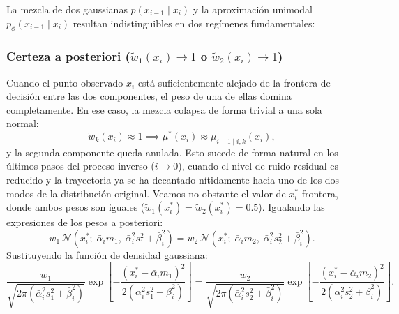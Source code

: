 \documentclass[11pt,a4paper]{article}
\begin{document}
La mezcla de dos gaussianas $p(x_{i-1} \mid x_i)$ y la aproximación unimodal $p_\phi(x_{i-1} \mid x_i)$ resultan indistinguibles en dos regímenes fundamentales:

\subsubsection{Certeza a posteriori ($\tilde{w}_1(x_i) \to 1$ o $\tilde{w}_2(x_i) \to 1$)}
Cuando el punto observado $x_i$ está suficientemente alejado de la frontera de decisión entre las dos componentes, el peso de una de ellas domina completamente. En ese caso, la mezcla colapsa de forma trivial a una sola normal:
\[
\tilde{w}_k(x_i) \approx 1 \implies \mu^*(x_i) \approx \mu_{i-1\mid i, k}(x_i),
\]
y la segunda componente queda anulada. Esto sucede de forma natural en los últimos pasos del proceso inverso ($i \to 0$), cuando el nivel de ruido residual es reducido y la trayectoria ya se ha decantado nítidamente hacia uno de los dos modos de la distribución original. Veamos no obstante el valor de $x_i^*$ frontera, donde ambos pesos son iguales ($\tilde{w}_1(x_i^*) = \tilde{w}_2(x_i^*) = 0.5$). Igualando las expresiones de los pesos a posteriori:
\[
w_1 \, \mathcal{N}\left(x_i^*;\; \bar{\alpha}_i m_1,\; \bar{\alpha}_i^2 s_1^2 + \bar{\beta}_i^2\right) = w_2 \, \mathcal{N}\left(x_i^*;\; \bar{\alpha}_i m_2,\; \bar{\alpha}_i^2 s_2^2 + \bar{\beta}_i^2\right).
\]
Sustituyendo la función de densidad gaussiana:
\[
\frac{w_1}{\sqrt{2\pi(\bar{\alpha}_i^2 s_1^2 + \bar{\beta}_i^2)}} \exp\left[-\frac{(x_i^* - \bar{\alpha}_i m_1)^2}{2(\bar{\alpha}_i^2 s_1^2 + \bar{\beta}_i^2)}\right] = \frac{w_2}{\sqrt{2\pi(\bar{\alpha}_i^2 s_2^2 + \bar{\beta}_i^2)}} \exp\left[-\frac{(x_i^* - \bar{\alpha}_i m_2)^2}{2(\bar{\alpha}_i^2 s_2^2 + \bar{\beta}_i^2)}\right].
\]
\end{document}
